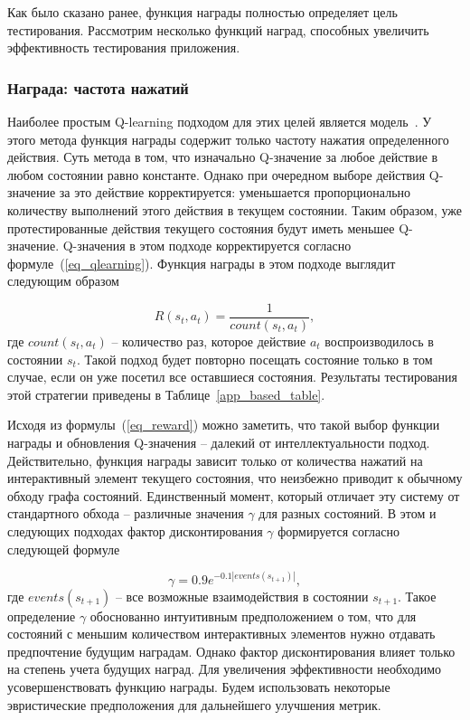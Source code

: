 Как было сказано ранее, функция награды полностью определяет цель тестирования. Рассмотрим несколько функций наград, способных увеличить эффективность тестирования приложения.

\subsubsection{Награда: частота нажатий}\label{events_count}

Наиболее простым Q-learning подходом для этих целей является модель~\cite{adamo2018reinforcement}. У этого метода функция награды содержит только частоту нажатия определенного действия. Суть метода в том, что изначально Q-значение за любое действие в любом состоянии равно константе. Однако при очередном выборе действия Q-значение за это действие корректируется: уменьшается пропорционально количеству выполнений этого действия в текущем состоянии. Таким образом, уже протестированные действия текущего состояния будут иметь меньшее Q-значение. Q-значения в этом подходе корректируется согласно формуле~(\ref{eq_qlearning}). Функция награды в этом подходе выглядит следующим образом

\begin{equation}
\label{eq_reward}
{\displaystyle
R(s_t, a_t) = \frac{1}{count(s_t, a_t)} ,
}
\end{equation}
где $count(s_t, a_t)$ -- количество раз, которое действие $a_t$ воспроизводилось в состоянии $s_t$. Такой подход будет повторно посещать состояние только в том случае, если он уже посетил все оставшиеся состояния. Результаты тестирования этой стратегии приведены в Таблице~\ref{app_based_table}.

Исходя из формулы~(\ref{eq_reward}) можно заметить, что такой выбор функции награды и обновления Q-значения -- далекий от интеллектуальности подход. Действительно, функция награды зависит только от количества нажатий на интерактивный элемент текущего состояния, что неизбежно приводит к обычному обходу графа состояний. Единственный момент, который отличает эту систему от стандартного обхода -- различные значения $\gamma$ для разных состояний. В этом и следующих подходах фактор дисконтирования $\gamma$ формируется согласно следующей формуле

$$
\gamma = 0.9 e^{\displaystyle{-0.1 |events(s_{t+1})|}} ,
$$
где $events(s_{t+1})$ -- все возможные взаимодействия в состоянии $s_{t+1}$. Такое определение $\gamma$ обоснованно интуитивным предположением о том, что для состояний с меньшим количеством интерактивных элементов нужно отдавать предпочтение будущим наградам. Однако фактор дисконтирования влияет только на степень учета будущих наград. Для увеличения эффективности необходимо усовершенствовать функцию награды. Будем использовать некоторые эвристические предположения для дальнейшего улучшения метрик.

